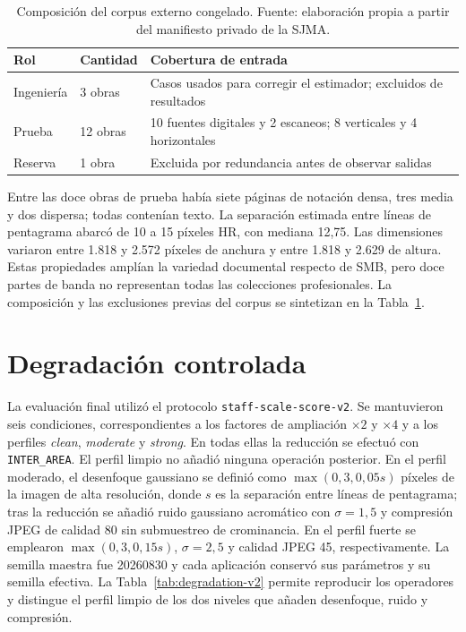 \begin{table}[htbp]
  \centering
  \small
  \caption{Composición del corpus externo congelado. Fuente: elaboración propia a partir del
  manifiesto privado de la SJMA.}
  \label{tab:external-corpus}
  \begin{tabular}{lp{}p{}}
    \toprule
    Rol & Cantidad & Cobertura de entrada \\
    \midrule
    Ingeniería & 3 obras & Casos usados para corregir el estimador; excluidos de resultados \\
    Prueba & 12 obras & 10 fuentes digitales y 2 escaneos; 8 verticales y 4 horizontales \\
    Reserva & 1 obra & Excluida por redundancia antes de observar salidas \\
    \bottomrule
  \end{tabular}
\end{table}

Entre las doce obras de prueba había siete páginas de notación densa, tres media y dos dispersa;
todas contenían texto. La separación estimada entre líneas de pentagrama abarcó de 10 a 15 píxeles
HR, con mediana 12,75. Las dimensiones variaron entre 1.818 y 2.572 píxeles de anchura y entre 1.818
y 2.629 de altura. Estas propiedades amplían la variedad documental respecto de SMB, pero doce
partes de banda no representan todas las colecciones profesionales.
La composición y las exclusiones previas del corpus se sintetizan en la
Tabla~\ref{tab:external-corpus}.

\section{Degradación controlada}
La evaluación final utilizó el protocolo \texttt{staff-scale-score-v2}. Se mantuvieron seis
condiciones, correspondientes a los factores de ampliación \(\times 2\) y \(\times 4\) y a los
perfiles \emph{clean}, \emph{moderate} y \emph{strong}. En todas ellas la reducción se efectuó con
\texttt{INTER\_AREA}. El perfil limpio no añadió ninguna operación posterior. En el perfil
moderado, el desenfoque gaussiano se definió como
\(\max(0{,}3,0{,}05s)\) píxeles de la imagen de alta resolución, donde \(s\) es la separación
entre líneas de pentagrama; tras la reducción se añadió ruido gaussiano acromático con
\(\sigma=1{,}5\) y compresión JPEG de calidad 80 sin submuestreo de crominancia. En el perfil
fuerte se emplearon \(\max(0{,}3,0{,}15s)\), \(\sigma=2{,}5\) y calidad JPEG 45,
respectivamente. La semilla maestra fue 20260830 y cada aplicación conservó sus parámetros y su
semilla efectiva.
La Tabla~\ref{tab:degradation-v2} permite reproducir los operadores y distingue el perfil limpio de
los dos niveles que añaden desenfoque, ruido y compresión.

